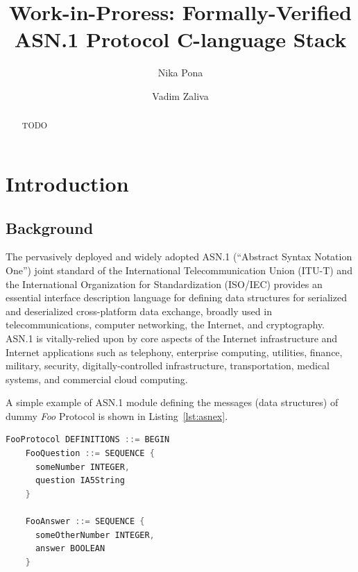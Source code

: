 \documentclass[acmsmall,nonacm]{acmart}
\begin{document}
\title{Work-in-Proress: Formally-Verified ASN.1 Protocol C-language Stack}

\author{Nika Pona}
\author{Vadim Zaliva}

\begin{abstract}
TODO
\end{abstract}

\maketitle

\tableofcontents

\section{Introduction}

\subsection{Background}

The pervasively deployed and widely adopted ASN.1 (``Abstract Syntax
Notation One'') \cite{ASN1Intro} joint standard of the International
Telecommunication Union (ITU-T) and the International Organization for
Standardization (ISO/IEC) provides an essential interface description
language for defining data structures for serialized and deserialized
cross-platform data exchange, broadly used in telecommunications,
computer networking, the Internet, and cryptography. ASN.1 is
vitally-relied upon by core aspects of the Internet infrastructure and
Internet applications such as telephony, enterprise computing,
utilities, finance, military, security, digitally-controlled
infrastructure, transportation, medical systems, and commercial cloud
computing.

A simple example of ASN.1 module defining the messages (data
structures) of dummy \textit{Foo} Protocol is shown in
Listing~\ref{lst:asnex}.

\begin{lstlisting}[language=C,label=lst:asnex,
  caption={ASN.1 example}]  
    FooProtocol DEFINITIONS ::= BEGIN
    FooQuestion ::= SEQUENCE {
      someNumber INTEGER,
      question IA5String
    }
    
    FooAnswer ::= SEQUENCE {
      someOtherNumber INTEGER,
      answer BOOLEAN
    }
\end{lstlisting}
\end{document}
